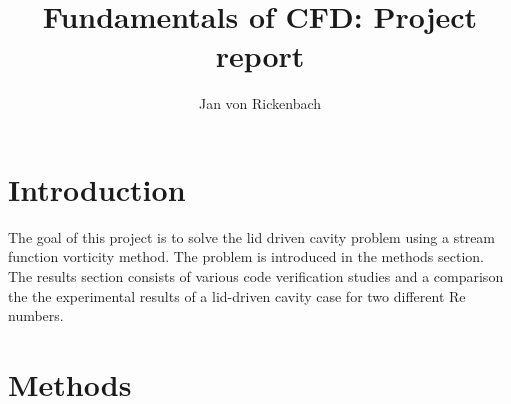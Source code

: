 \title{Fundamentals of CFD: Project report}
\author{Jan von Rickenbach}
\maketitle
\newpage

\section{Introduction}
%
The goal of this project is to solve the lid driven cavity problem using a stream function vorticity method. The problem is introduced in the methods section. The results section consists of various code verification studies and a comparison the the experimental results of a lid-driven cavity case for two different Re numbers.

\section{Methods}
%
